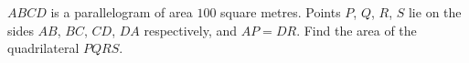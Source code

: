 $ABCD$ is a parallelogram of area $100$ square metres. Points $P$, $Q$, $R$, $S$ lie on the sides $AB$, $BC$, $CD$, $DA$ respectively, and $AP=DR$. Find the area of the quadrilateral $PQRS$.
